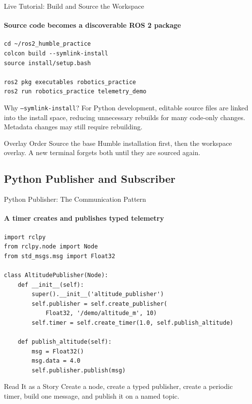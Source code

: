 \begin{frame}[fragile]{Live Tutorial: Build and Source the Workspace}
\framesubtitle{Source code becomes a discoverable ROS 2 package}
\begin{verbatim}
cd ~/ros2_humble_practice
colcon build --symlink-install
source install/setup.bash

ros2 pkg executables robotics_practice
ros2 run robotics_practice telemetry_demo
\end{verbatim}
\begin{exampleblock}{Why \texttt{--symlink-install}?}
For Python development, editable source files are linked into the install space, reducing unnecessary rebuilds for many code-only changes. Metadata changes may still require rebuilding.
\end{exampleblock}
\begin{alertblock}{Overlay Order}
Source the base Humble installation first, then the workspace overlay. A new terminal forgets both until they are sourced again.
\end{alertblock}
\end{frame}

\subsection{Python Publisher and Subscriber}

\begin{frame}[fragile]{Python Publisher: The Communication Pattern}
\framesubtitle{A timer creates and publishes typed telemetry}
\scriptsize
\begin{verbatim}
import rclpy
from rclpy.node import Node
from std_msgs.msg import Float32

class AltitudePublisher(Node):
    def __init__(self):
        super().__init__('altitude_publisher')
        self.publisher = self.create_publisher(
            Float32, '/demo/altitude_m', 10)
        self.timer = self.create_timer(1.0, self.publish_altitude)

    def publish_altitude(self):
        msg = Float32()
        msg.data = 4.0
        self.publisher.publish(msg)
\end{verbatim}
\begin{block}{Read It as a Story}
Create a node, create a typed publisher, create a periodic timer, build one message, and publish it on a named topic.
\end{block}
\end{frame}

